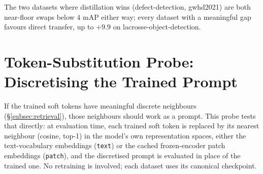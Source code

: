 \documentclass{article}
\begin{document}
The two datasets where distillation wins (defect-detection, gwhd2021) are both near-floor swaps below $4$ mAP either way; every dataset with a meaningful gap favours direct transfer, up to $+9.9$ on lacrosse-object-detection.

\section{Token-Substitution Probe: Discretising the Trained Prompt}
\label{app:substitution}

If the trained soft tokens have meaningful discrete neighbours (\S\ref{subsec:retrieval}), those neighbours should work as a prompt.
This probe tests that directly: at evaluation time, each trained soft token is replaced by its nearest neighbour (cosine, top-1) in the model's own representation spaces, either the text-vocabulary embeddings (\texttt{text}) or the cached frozen-encoder patch embeddings (\texttt{patch}), and the discretised prompt is evaluated in place of the trained one.
No retraining is involved; each dataset uses its canonical checkpoint.
\end{document}
